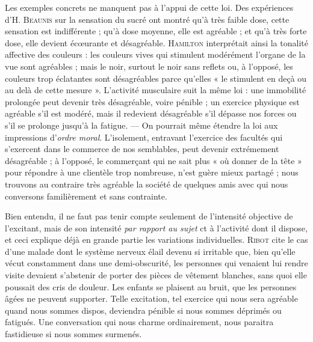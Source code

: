 {\footnotesize
Les exemples concrets ne manquent pas à l'appui de cette loi. Des expériences
d'H. \textsc{Beaunis} sur la sensation du sucré ont montré qu’à très faible
dose, cette sensation est indifférente ; qu’à dose moyenne, elle est agréable ;
et qu’à très forte dose, elle devient écœurante et désagréable. \textsc{Hamilton}
interprétait ainsi la tonalité affective des couleurs : les couleurs vives qui
stimulent modérément l'organe de la vue sont agréables ; mais le noir, surtout
le noir sans reflets ou, à l'opposé, les couleurs trop éclatantes sont
désagréables parce qu’elles « le stimulent en deçà ou au delà de cette mesure ».
L'activité musculaire suit la même loi : une immobilité prolongée peut
devenir très désagréable, voire pénible ; un exercice physique est agréable
s’il est modéré, mais il redevient désagréable s’il dépasse nos forces ou s’il
se prolonge jusqu’à la fatigue. — On pourrait même étendre la loi aux
impressions d'{\it ordre moral}. L'isolement, entravant l'exercice des facultés
qui s’exercent dans le commerce de nos semblables, peut devenir extrémement
désagréable ; à l’opposé, le commerçant qui ne sait plus « où donner
de la tête » pour répondre à une clientèle trop nombreuse, n'est guère mieux
partagé ; nous trouvons au contraire très agréable la société de quelques
amis avec qui nous conversons familièrement et sans contrainte.
}

Bien entendu, il ne faut pas tenir compte seulement de l'intensité
objective de l’excitant, mais de son intensité {\it par rapport au sujet} ct
à l’activité dont il dispose, et ceci explique déjà en grande partie les
variations individuelles. \textsc{Ribot} cite le cas d’une malade dont le
système nerveux élail devenu si irritable que, bien qu’elle vécut
constamment dans une demi-obscurité, les personnes qui venaient
lui rendre visite devaient s'abstenir de porter des pièces de vêtement
blanches, sans quoi elle poussait des cris de douleur. Les enfants se
plaisent au bruit, que les personnes âgées ne peuvent supporter.
Telle excitation, tel exercice qui nous sera agréable quand nous
sommes dispos, deviendra pénible si nous sommes déprimés ou fatigués.
Une conversation qui nous charme ordinairement, nous paraitra fastidieuse
si nous sommes surmenés.

